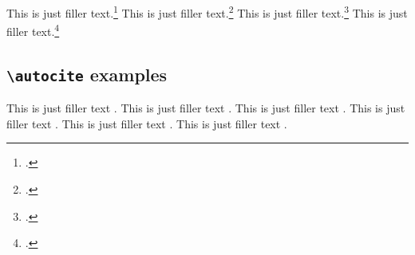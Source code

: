 \documentclass[a4paper]{article}
\newcommand{\cmd}[1]{\texttt{\textbackslash #1}}
\begin{document}
\clearpage

This is just filler text.\footcite{kant:kpv}
This is just filler text.\footcite{kant:ku}
This is just filler text.\footcite[24]{kant:kpv}
This is just filler text.\footcite[59--63]{kant:ku}

\clearpage

\subsection*{\cmd{autocite} examples}


This is just filler text \autocite{aristotle:rhetoric}.
This is just filler text \autocite{averroes/bland}.
This is just filler text \autocite{aristotle:rhetoric}.
This is just filler text \autocite{aristotle:anima}.
This is just filler text \autocite{aristotle:physics}.
This is just filler text \autocite{aristotle:physics}.

\clearpage


\printshorthands
\printbibliography
\end{document}
